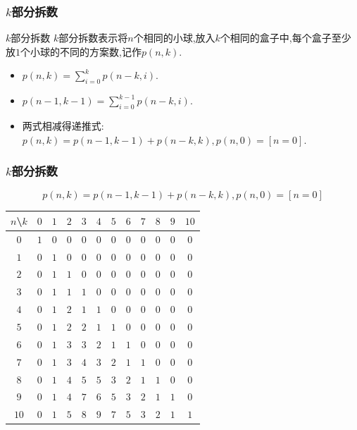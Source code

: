 \documentclass{beamer}
\newcommand{\pau}{}
\begin{document}
\begin{frame}[fragile]
    \frametitle{$k$部分拆数}
    \begin{block}{$k$部分拆数}
        $k$部分拆数表示将$n$个相同的小球,放入$k$个相同的盒子中,每个盒子至少放$1$个小球的不同的方案数,记作$p(n,k)$.
    \end{block}
    \begin{itemize}
    	\item $p(n,k)=\sum\limits_{i=0}^kp(n-k,i)$.\pau
    	\item $p(n-1,k-1)=\sum\limits_{i=0}^{k-1}p(n-k,i)$.\pau
    	\item 两式相减得递推式: $p(n,k)=p(n-1,k-1)+p(n-k,k),p(n,0)=[n=0]$.
    \end{itemize}
\end{frame}

\begin{frame}[fragile]
    \frametitle{$k$部分拆数}
    $$p(n,k)=p(n-1,k-1)+p(n-k,k),p(n,0)=[n=0]$$
	\begin{center}
		\footnotesize
		\begin{tabular}{c|ccccccccccc}
			$n$\textbackslash$k$&$0$&$1$&$2$&$3$&$4$&$5$&$6$&$7$&$8$&$9$&$10$\\\hline
			$0$&$1$&$0$&$0$&$0$&$0$&$0$&$0$&$0$&$0$&$0$&$0$\\
			$1$&$0$&$1$&$0$&$0$&$0$&$0$&$0$&$0$&$0$&$0$&$0$\\
			$2$&$0$&$1$&$1$&$0$&$0$&$0$&$0$&$0$&$0$&$0$&$0$\\
			$3$&$0$&$1$&$1$&$1$&$0$&$0$&$0$&$0$&$0$&$0$&$0$\\
			$4$&$0$&$1$&$2$&$1$&$1$&$0$&$0$&$0$&$0$&$0$&$0$\\
			$5$&$0$&$1$&$2$&$2$&$1$&$1$&$0$&$0$&$0$&$0$&$0$\\
			$6$&$0$&$1$&$3$&$3$&$2$&$1$&$1$&$0$&$0$&$0$&$0$\\
			$7$&$0$&$1$&$3$&$4$&$3$&$2$&$1$&$1$&$0$&$0$&$0$\\
			$8$&$0$&$1$&$4$&$5$&$5$&$3$&$2$&$1$&$1$&$0$&$0$\\
			$9$&$0$&$1$&$4$&$7$&$6$&$5$&$3$&$2$&$1$&$1$&$0$\\
			$10$&$0$&$1$&$5$&$8$&$9$&$7$&$5$&$3$&$2$&$1$&$1$\\
		\end{tabular}
	\end{center}
\end{frame}
\end{document}
